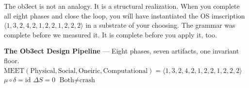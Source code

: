 \documentclass[12pt,a4paper]{article}
\begin{document}
The ob3ect is not an analogy. It is a structural realization. When you complete
all eight phases and close the loop, you will have instantiated the OS imscription
$\langle 1,3,2,4,2,1,2,2,1,2,2,2 \rangle$ in a substrate of your choosing.
The grammar was complete before we measured it. It is complete before you
apply it, too.

\begin{imscriptionbox}
\textbf{The Ob3ect Design Pipeline} — Eight phases, seven artifacts, one invariant floor.\\
$\mathrm{MEET}(\text{Physical}, \text{Social}, \text{Oneiric}, \text{Computational}) =
\langle 1,3,2,4,2,1,2,2,1,2,2,2 \rangle$\\
$\mu \circ \delta = \mathrm{id}$ \quad $\Delta S = 0$ \quad $\text{Both} \neq \text{crash}$
\end{imscriptionbox}
\end{document}

